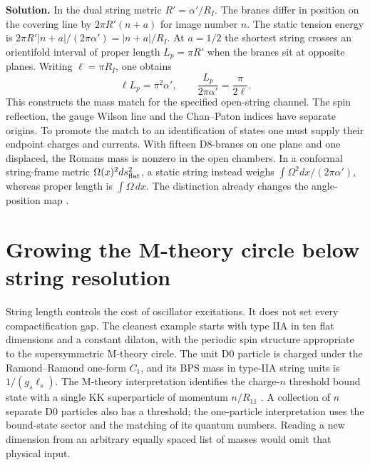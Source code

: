 \documentclass[10pt]{article}
\begin{document}
\noindent\textbf{Solution.}
In the dual string metric $R'=\alpha'/R_I$. The branes differ in position on the covering line by $2\pi R'(n+a)$ for image number $n$. The static tension energy is $2\pi R'|n+a|/(2\pi\alpha')=|n+a|/R_I$. At $a=1/2$ the shortest string crosses an orientifold interval of proper length $L_p=\pi R'$ when the branes sit at opposite planes. Writing $\ell=\pi R_I$, one obtains
\begin{equation}
 \ell L_p=\pi^2\alpha',\qquad
 \frac{L_p}{2\pi\alpha'}=\frac{\pi}{2\ell}.
\end{equation}
This constructs the mass match for the specified open-string channel. The spin reflection, the gauge Wilson line and the Chan--Paton indices have separate origins. To promote the match to an identification of states one must supply their endpoint charges and currents. With fifteen D8-branes on one plane and one displaced, the Romans mass is nonzero in the open chambers. In a conformal string-frame metric $\Omega(x)^2ds_{\rm flat}^2$, a static string instead weighs $\int\Omega^2dx/(2\pi\alpha')$, whereas proper length is $\int\Omega\,dx$. The distinction already changes the angle-position map \cite{PW1996,BGL1998,dictionarynote,SevenMTheory2026}.

\section{Growing the M-theory circle below string resolution}

String length controls the cost of oscillator excitations. It does not set every compactification gap. The cleanest example starts with type IIA in ten flat dimensions and a constant dilaton, with the periodic spin structure appropriate to the supersymmetric M-theory circle. The unit D0 particle is charged under the Ramond--Ramond one-form $C_1$, and its BPS mass in type-IIA string units is $1/(g_s\ell_s)$. The M-theory interpretation identifies the charge-$n$ threshold bound state with a single KK superparticle of momentum $n/R_{11}$ \cite{Witten1995Circle}. A collection of $n$ separate D0 particles also has a threshold; the one-particle interpretation uses the bound-state sector and the matching of its quantum numbers. Reading a new dimension from an arbitrary equally spaced list of masses would omit that physical input.
\end{document}
